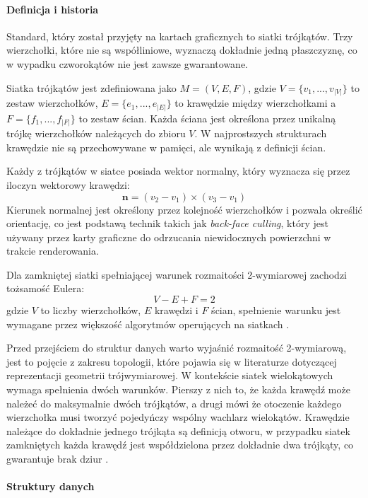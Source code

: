 \paragraph{Definicja i historia}
Standard, który został przyjęty na kartach graficznych to siatki trójkątów. Trzy wierzchołki, które nie są współliniowe, wyznaczą dokładnie jedną płaszczyznę, co w wypadku czworokątów nie jest zawsze gwarantowane.

Siatka trójkątów jest zdefiniowana jako $M=(V,E,F)$, gdzie $V = \{v_1,...,v_{|V|}\}$ to zestaw wierzchołków, $E = \{e_1,...,e_{|E|}\}$ to krawędzie między wierzchołkami a $F = \{f_1,...,f_{|F|}\}$ to zestaw ścian. Każda ściana jest określona przez unikalną trójkę wierzchołków należących do zbioru $V$. W najprostszych strukturach krawędzie nie są przechowywane w pamięci, ale wynikają z definicji ścian.

Każdy z trójkątów w siatce posiada wektor normalny, który wyznacza się przez iloczyn wektorowy krawędzi:
\begin{equation}
    \mathbf{n} = (v_2 - v_1) \times (v_3 - v_1)
\end{equation}
Kierunek normalnej jest określony przez kolejność wierzchołków i pozwala określić orientację, co jest podstawą technik takich jak \textit{back-face culling}, który jest używany przez karty graficzne do odrzucania niewidocznych powierzchni w trakcie renderowania.

Dla zamkniętej siatki spełniającej warunek rozmaitości 2-wymiarowej zachodzi tożsamość Eulera:
\begin{equation}
    V - E + F = 2
\end{equation}
gdzie $V$ to liczby wierzchołków, $E$ krawędzi i $F$ ścian, spełnienie warunku jest wymagane przez większość algorytmów operujących na siatkach \cite{botsch2006}.

Przed przejściem do struktur danych warto wyjaśnić rozmaitość 2-wymiarową, jest to pojęcie z zakresu topologii, które pojawia się w literaturze dotyczącej reprezentacji geometrii trójwymiarowej. W kontekście siatek wielokątowych wymaga spełnienia dwóch warunków. Pierszy z nich to, że każda krawędź może należeć do maksymalnie dwóch trójkątów, a drugi mówi że otoczenie każdego wierzchołka musi tworzyć pojedyńczy wspólny wachlarz wielokątów. Krawędzie należące do dokładnie jednego trójkąta są definicją otworu, w przypadku siatek zamkniętych każda krawędź jest współdzielona przez dokładnie dwa trójkąty, co gwarantuje brak dziur \cite{bloom1997}.

\paragraph{Struktury danych}

